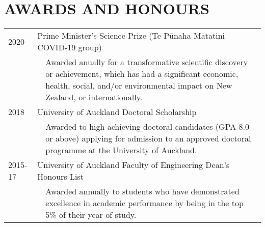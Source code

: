 \documentclass[paper=a4paper,fontsize=11pt]{scrartcl} %
\newlength{\spacebox}
\newcommand{\NewPart}[1]{\section*{\uppercase{#1}}}
\newcommand{\AwardEntry}[3]{
    {#1} & \multicolumn{2}{l}{#2}\\
    & & \small{#3}\normalsize\\
}
\begin{document}
\NewPart{Awards and Honours}
\begin{tabular}{p{1.0\spacebox} p{0.2\spacebox} p{6.5\spacebox}}
    \AwardEntry{2020}{Prime Minister's Science Prize (Te P\=unaha Matatini COVID-19 group)}{Awarded anually for a transformative scientific discovery or achievement, which has had a significant economic, health, social, and/or environmental impact on New Zealand, or internationally.}
    \AwardEntry{2018}{University of Auckland Doctoral Scholarship}{Awarded to high-achieving doctoral candidates (GPA 8.0 or above) applying for admission to an approved doctoral programme at the University of Auckland.}
    \AwardEntry{2015-17}{University of Auckland Faculty of Engineering Dean's Honours List}{Awarded annually to students who have demonstrated excellence in academic performance by being in the top 5\% of their year of study.}
\end{tabular}

\vspace{1ex} \titlerule[2pt] \vspace{1ex}
\end{document}
